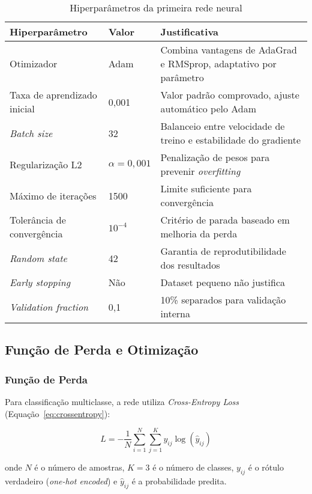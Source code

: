 \begin{table}[htbp]
\centering
\caption{Hiperparâmetros da primeira rede neural}
\label{tab:hiperparametros_rede1}
\begin{tabular}{@{}llp{6.5cm}@{}}
\toprule
\textbf{Hiperparâmetro} & \textbf{Valor} & \textbf{Justificativa} \\ \midrule
Otimizador & Adam & Combina vantagens de AdaGrad e RMSprop, adaptativo por parâmetro \\
Taxa de aprendizado inicial & 0,001 & Valor padrão comprovado, ajuste automático pelo Adam \\
\textit{Batch size} & 32 & Balanceio entre velocidade de treino e estabilidade do gradiente \\
Regularização L2 & $\alpha = 0,001$ & Penalização de pesos para prevenir \textit{overfitting} \\
Máximo de iterações & 1500 & Limite suficiente para convergência \\
Tolerância de convergência & $10^{-4}$ & Critério de parada baseado em melhoria da perda \\
\textit{Random state} & 42 & Garantia de reprodutibilidade dos resultados \\
\textit{Early stopping} & Não & Dataset pequeno não justifica \\
\textit{Validation fraction} & 0,1 & 10\% separados para validação interna \\ \bottomrule
\end{tabular}
\end{table}

\subsection{Função de Perda e Otimização}

\subsubsection{Função de Perda}

Para classificação multiclasse, a rede utiliza \textit{Cross-Entropy Loss} (Equação~\ref{eq:crossentropy}):

\begin{equation}
\label{eq:crossentropy}
L = -\frac{1}{N} \sum_{i=1}^{N} \sum_{j=1}^{K} y_{ij} \log(\hat{y}_{ij})
\end{equation}

onde $N$ é o número de amostras, $K=3$ é o número de classes, $y_{ij}$ é o rótulo verdadeiro (\textit{one-hot encoded}) e $\hat{y}_{ij}$ é a probabilidade predita.

